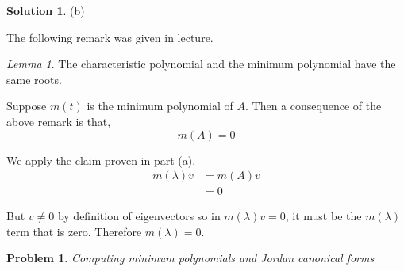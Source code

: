\documentclass{article}
\newtheorem{problem}{Problem}
\theoremstyle{definition}
\newtheorem*{solution}{Solution}
\theoremstyle{remark}
\newtheorem*{lemma}{Lemma}
\begin{document}
\begin{solution}
(b)

The following remark was given in lecture.
\begin{lemma}
The characteristic polynomial and the minimum polynomial have the same roots.
\end{lemma}

Suppose $m(t)$ is the minimum polynomial of $A$.
Then a consequence of the above remark is that,
\[m(A)=0\]

We apply the claim proven in part (a).
\begin{align*}
m(\lambda)v & = m(A)v \\
& = 0
\end{align*}

But $v\neq 0$ by definition of eigenvectors so in $m(\lambda)v = 0$, it must be the $m(\lambda)$ term that is zero.
Therefore $m(\lambda)=0$.

\end{solution}

\begin{problem}

Computing minimum polynomials and Jordan canonical forms

\end{problem}
\end{document}
